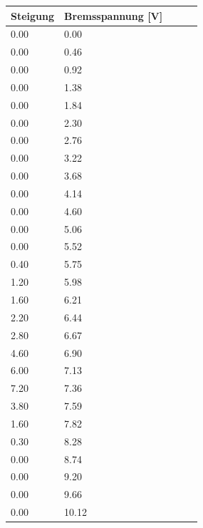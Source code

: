 \begin{minipage}{\linewidth}
    \begin{table}[H]
        \centering
    
    \begin{tabular}{lllll}
        \toprule
        Steigung & Bremsspannung [V]\\
        \midrule
        0.00  &  0.00  \\        
        0.00  &  0.46  \\        
        0.00  &  0.92  \\        
        0.00  &  1.38  \\        
        0.00  &  1.84  \\        
        0.00  &  2.30  \\        
        0.00  &  2.76  \\        
        0.00  &  3.22  \\        
        0.00  &  3.68  \\        
        0.00  &  4.14  \\        
        0.00  &  4.60  \\        
        0.00  &  5.06  \\        
        0.00  &  5.52  \\        
        0.40  &  5.75  \\        
        1.20  &  5.98  \\        
        1.60  &  6.21  \\        
        2.20  &  6.44  \\        
        2.80  &  6.67  \\
        4.60  &  6.90  \\
        6.00  &  7.13  \\
        7.20  &  7.36  \\
        3.80  &  7.59  \\
        1.60  &  7.82  \\
        0.30  &  8.28  \\
        0.00  &  8.74  \\
        0.00  &  9.20  \\
        0.00  &  9.66  \\
        0.00  &  10.12  \\
        \bottomrule
        
    \end{tabular}
    \label{tab:3}
    \end{table}
    \end{minipage}

